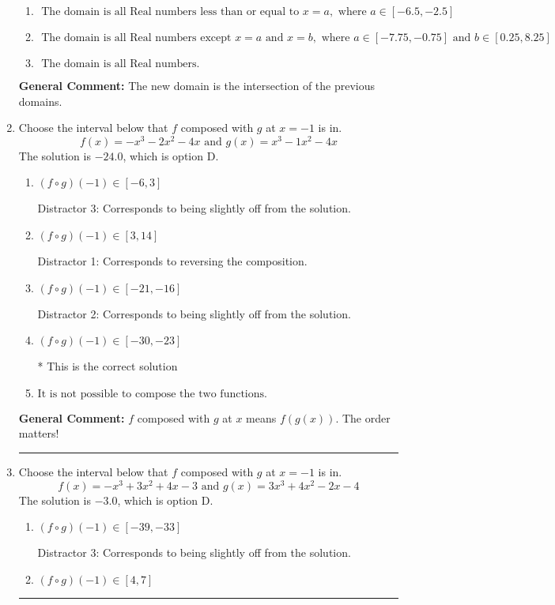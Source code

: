 \documentclass{extbook}[14pt]
\newcommand{\litem}[1]{\item #1

\rule{\textwidth}{0.4pt}}
\begin{document}
\begin{enumerate}
{\begin{enumerate}[label=\Alph*.]
\item \( \text{ The domain is all Real numbers less than or equal to } x = a, \text{ where } a \in [-6.5, -2.5] \)


\item \( \text{ The domain is all Real numbers except } x = a \text{ and } x = b, \text{ where } a \in [-7.75, -0.75] \text{ and } b \in [0.25, 8.25] \)


\item \( \text{ The domain is all Real numbers. } \)


\end{enumerate}

\textbf{General Comment:} The new domain is the intersection of the previous domains.
}
\litem{
Choose the interval below that $f$ composed with $g$ at $x=-1$ is in.
\[ f(x) = -x^{3} -2 x^{2} -4 x \text{ and } g(x) = x^{3} -1 x^{2} -4 x \]The solution is \( -24.0 \), which is option D.\begin{enumerate}[label=\Alph*.]
\item \( (f \circ g)(-1) \in [-6, 3] \)

 Distractor 3: Corresponds to being slightly off from the solution.
\item \( (f \circ g)(-1) \in [3, 14] \)

 Distractor 1: Corresponds to reversing the composition.
\item \( (f \circ g)(-1) \in [-21, -16] \)

 Distractor 2: Corresponds to being slightly off from the solution.
\item \( (f \circ g)(-1) \in [-30, -23] \)

* This is the correct solution
\item \( \text{It is not possible to compose the two functions.} \)


\end{enumerate}

\textbf{General Comment:} $f$ composed with $g$ at $x$ means $f(g(x))$. The order matters!
}
\litem{
Choose the interval below that $f$ composed with $g$ at $x=-1$ is in.
\[ f(x) = -x^{3} +3 x^{2} +4 x -3 \text{ and } g(x) = 3x^{3} +4 x^{2} -2 x -4 \]The solution is \( -3.0 \), which is option D.\begin{enumerate}[label=\Alph*.]
\item \( (f \circ g)(-1) \in [-39, -33] \)

 Distractor 3: Corresponds to being slightly off from the solution.
\item \( (f \circ g)(-1) \in [4, 7] \)


\end{enumerate}}
\end{enumerate}
\end{document}
